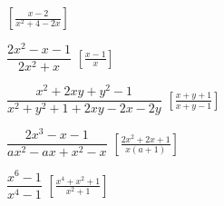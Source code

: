 \begin{esercizio}[\Ast]
\begin{multicols}{2}
\begin{enumeratea}
  \hfill \(\left[\frac{x-2}{x^2+4-2x}\right]\)
 \item \(\dfrac{2x^{2}-x-1}{2x^{2}+x}\)
  \hfill \(\left[\frac{x-1}{x}\right]\)
 \item \(\dfrac{x^{2}+2xy+y^{2}-1}{x^{2}+y^{2}+1+2xy-2x-2y}\)
  \hfill \(\left[\frac{x+y+1}{x+y-1}\right]\)
 \item \(\dfrac{2x^{3}-x-1}{ax^{2}-ax+x^{2}-x}\)
  \hfill \(\left[\frac{2x^2+2x+1}{x(a+1)}\right]\)
 \item \(\dfrac{x^{6}-1}{x^{4}-1}\)
  \hfill \(\left[\frac{x^{4}+x^{2}+1}{x^2+1}\right]\)
\end{enumeratea}
\end{multicols}
\end{esercizio}

\subsubsection*{}

